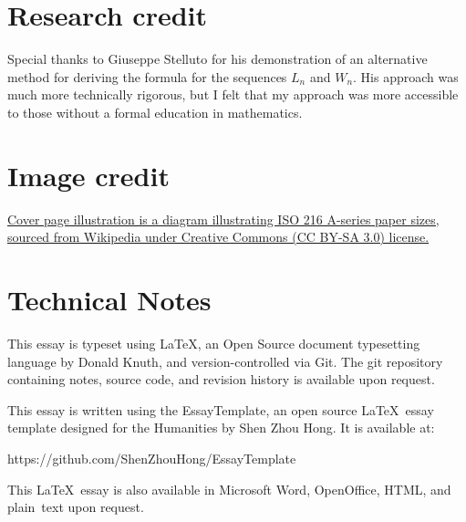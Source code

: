 
\section*{Research credit}
Special thanks to Giuseppe Stelluto for his demonstration of an alternative method for deriving the formula for the sequences $L_n$ and $W_n$. His approach was much more technically rigorous, but I felt that my approach was more accessible to those without a formal education in mathematics.

\section*{Image credit}
\href{https://en.wikipedia.org/wiki/File:A_size_illustration2.svg}{Cover page illustration is a diagram illustrating ISO 216 A-series paper sizes, sourced from Wikipedia under Creative Commons (CC BY-SA 3.0) license.}

\section*{Technical Notes}
This essay is typeset using \LaTeX, an Open Source document typesetting language
by Donald Knuth, and version-controlled via Git. The git repository containing notes, source code, and revision history is available upon request.


\noindent
This essay is written using the EssayTemplate, an open source \LaTeX\ essay
template designed for the Humanities by Shen Zhou Hong. It is available at:

https://github.com/ShenZhouHong/EssayTemplate

\vfill
\begin{center}
This \LaTeX\ essay is also available in Microsoft Word, OpenOffice, HTML, and \mbox{plain text} upon request.
\end{center}
